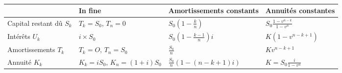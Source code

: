 \begin{f} 
\ \newline

	\footnotesize
\renewcommand{\arraystretch}{2}
\begin{tabular}{|m{10ex}|m{19ex}|m{19ex}|m{17ex}|}
\rowcolor{BleuProfondIRA!40}   	\hline &\textbf{In fine}			&   	\textbf{Amortissements  constants} &  		\textbf{Annuités  constantes} \\
	\hline Capital restant dû \(S_k\) & \(T_k=S_0\), \(T_n=0\)& \(S_{0}\left(1-\frac{k}{n}\right)\) & \(S_{0} \frac{1-v^{n-k}}{1-v^{n}}\)\\
	\hline Intérêts \(U_k\) 		& \(i\times S_0\) & \(S_{0}\left(1-\frac{k-1}{n}\right) i\) & \(K\left(1-v^{n-k+1}\right)\) \\
	\hline Amortis\-sements \(T_k\) &	\(T_k=O\), \(T_n=S_0\) & \(\frac{S_{0}}{n}\) & \(K v^{n-k+1}\) \\
	\hline Annuité \(K_k\) & 	\(K_k=i S_0\), \(K_n=(1+i)S_0\) 	 & \(\frac{S_{0}}{n}(1-(n-k+1) i) \) & \(K=S_{0} \frac{i}{1-v^{n}} \) \\
	\hline
\end{tabular}

\end{f}
